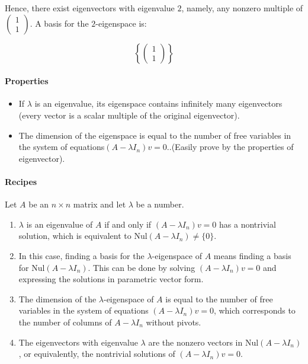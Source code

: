 \documentclass[a4paper,12pt]{article}
\begin{document}
\begin{frame}
Hence, there exist eigenvectors with eigenvalue \( 2 \), namely, any nonzero multiple of \( \begin{pmatrix} 1 \\ 1 \end{pmatrix} \). A basis for the \( 2 \)-eigenspace is:

\[
\left\{ \begin{pmatrix} 1 \\ 1 \end{pmatrix} \right\}
\]
\paragraph{Properties}
\begin{itemize}
    \item If \(\lambda\) is an eigenvalue, its eigenspace contains infinitely many eigenvectors (every vector is a scalar multiple of the original eigenvector).
    \item The dimension of the eigenspace is equal to the number of free variables in the system of equations\((A - \lambda I_n)v = 0.\).(Easily prove by the properties of eigenvector).
\end{itemize}

\paragraph{Recipes}

Let \( A \) be an \( n \times n \) matrix and let \( \lambda \) be a number.

\begin{enumerate}
    \item \( \lambda \) is an eigenvalue of \( A \) if and only if \( (A - \lambda I_n)v = 0 \) has a nontrivial solution, which is equivalent to \( \text{Nul}(A - \lambda I_n) \neq \{0\} \).
    
    \item In this case, finding a basis for the \( \lambda \)-eigenspace of \( A \) means finding a basis for \( \text{Nul}(A - \lambda I_n) \). This can be done by solving \( (A - \lambda I_n)v = 0 \) and expressing the solutions in parametric vector form.
    
    \item The dimension of the \( \lambda \)-eigenspace of \( A \) is equal to the number of free variables in the system of equations \( (A - \lambda I_n)v = 0 \), which corresponds to the number of columns of \( A - \lambda I_n \) without pivots.
    
    \item The eigenvectors with eigenvalue \( \lambda \) are the nonzero vectors in \( \text{Nul}(A - \lambda I_n) \), or equivalently, the nontrivial solutions of \( (A - \lambda I_n)v = 0 \).
\end{enumerate}

\end{frame}
\end{document}
